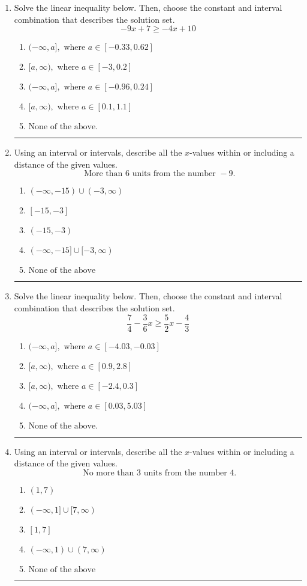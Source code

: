 \documentclass[14pt]{extbook}
\newcommand{\litem}[1]{\item#1\hspace*{-1cm}\rule{\textwidth}{0.4pt}}
\begin{document}
\begin{enumerate}
{\begin{enumerate}[label=\Alph*.]
\end{enumerate} }
\litem{
Solve the linear inequality below. Then, choose the constant and interval combination that describes the solution set.\[ -9x + 7 \geq -4x + 10 \]\begin{enumerate}[label=\Alph*.]
\item \( (-\infty, a], \text{ where } a \in [-0.33, 0.62] \)
\item \( [a, \infty), \text{ where } a \in [-3, 0.2] \)
\item \( (-\infty, a], \text{ where } a \in [-0.96, 0.24] \)
\item \( [a, \infty), \text{ where } a \in [0.1, 1.1] \)
\item \( \text{None of the above}. \)

\end{enumerate} }
\litem{
Using an interval or intervals, describe all the $x$-values within or including a distance of the given values.\[ \text{ More than } 6 \text{ units from the number } -9. \]\begin{enumerate}[label=\Alph*.]
\item \( (-\infty, -15) \cup (-3, \infty) \)
\item \( [-15, -3] \)
\item \( (-15, -3) \)
\item \( (-\infty, -15] \cup [-3, \infty) \)
\item \( \text{None of the above} \)

\end{enumerate} }
\litem{
Solve the linear inequality below. Then, choose the constant and interval combination that describes the solution set.\[ \frac{7}{4} - \frac{3}{6} x \geq \frac{5}{2} x - \frac{4}{3} \]\begin{enumerate}[label=\Alph*.]
\item \( (-\infty, a], \text{ where } a \in [-4.03, -0.03] \)
\item \( [a, \infty), \text{ where } a \in [0.9, 2.8] \)
\item \( [a, \infty), \text{ where } a \in [-2.4, 0.3] \)
\item \( (-\infty, a], \text{ where } a \in [0.03, 5.03] \)
\item \( \text{None of the above}. \)

\end{enumerate} }
\litem{
Using an interval or intervals, describe all the $x$-values within or including a distance of the given values.\[ \text{ No more than } 3 \text{ units from the number } 4. \]\begin{enumerate}[label=\Alph*.]
\item \( (1, 7) \)
\item \( (-\infty, 1] \cup [7, \infty) \)
\item \( [1, 7] \)
\item \( (-\infty, 1) \cup (7, \infty) \)
\item \( \text{None of the above} \)


\end{enumerate}}
\end{enumerate}
\end{document}
